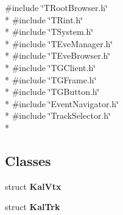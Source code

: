 {\ttfamily \#include \char`\"{}T\-Root\-Browser.\-h\char`\"{}}\\*
{\ttfamily \#include \char`\"{}T\-Rint.\-h\char`\"{}}\\*
{\ttfamily \#include \char`\"{}T\-System.\-h\char`\"{}}\\*
{\ttfamily \#include \char`\"{}T\-Eve\-Manager.\-h\char`\"{}}\\*
{\ttfamily \#include \char`\"{}T\-Eve\-Browser.\-h\char`\"{}}\\*
{\ttfamily \#include \char`\"{}T\-G\-Client.\-h\char`\"{}}\\*
{\ttfamily \#include \char`\"{}T\-G\-Frame.\-h\char`\"{}}\\*
{\ttfamily \#include \char`\"{}T\-G\-Button.\-h\char`\"{}}\\*
{\ttfamily \#include \char`\"{}Event\-Navigator.\-h\char`\"{}}\\*
{\ttfamily \#include \char`\"{}Track\-Selector.\-h\char`\"{}}\\*
\subsection*{Classes}
\begin{DoxyCompactItemize}
\item 
struct {\bf Kal\-Vtx}
\item 
struct {\bf Kal\-Trk}
\end{DoxyCompactItemize}
